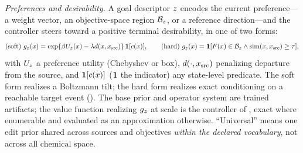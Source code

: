 \emph{Preferences and desirability.} A goal descriptor $z$ encodes the current preference---a weight
vector, an objective-space region $\mathcal{B}_z$, or a reference direction---and the controller steers
toward a positive terminal desirability, in one of two forms:
\begin{align}
\text{(soft)}\ \desir_\descr(x)=\exp\{\beta U_\descr(x)-\lambda d(x,\xsrc)\}\,\one[c(x)],
\qquad
\text{(hard)}\ \desir_\descr(x)=\one[\Fobj(x)\in\Bset_\descr\wedge\simfun(x,\xsrc)\ge\tau],
\label{eq:g}
\end{align}
with $U_z$ a preference utility (Chebyshev or box), $d(\cdot,x_{\mathrm{src}})$ penalizing departure from the
source, and $\mathbf{1}[c(x)]$ ($\mathbf{1}$ the indicator) any state-level predicate. The soft form realizes a
Boltzmann tilt; the hard form realizes exact conditioning on a reachable target event ().
The base prior and operator system are trained artifacts; the value function realizing $g_z$ at
scale is the controller of , exact where enumerable and evaluated as an approximation
otherwise. ``Universal'' means one edit prior shared across sources and objectives \emph{within the
declared vocabulary}, not across all chemical space.

